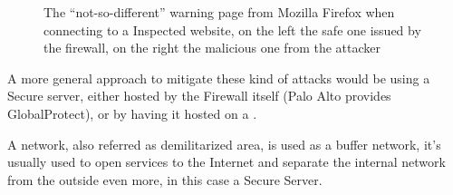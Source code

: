 \begin{figure}[!hb]
 \centering
 \vspace{0.5cm}
 \caption{The ``not-so-different'' warning page from Mozilla Firefox when connecting to a  Inspected website, on the left the safe one issued by the firewall, on the right the malicious one from the attacker}
\end{figure}

\newpage

A more general approach to mitigate these kind of attacks would be using a Secure  server, either hosted by the Firewall itself (Palo Alto provides GlobalProtect), or by having it hosted on a .

A  network, also referred as demilitarized area, is used as a buffer network, it's usually used to open services to the Internet and separate the internal network from the outside even more, in this case a Secure Server.

